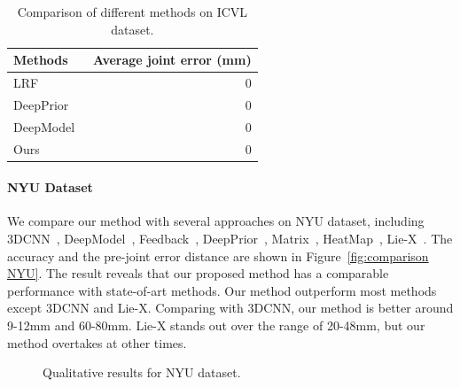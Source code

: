 \documentclass[journal,comsoc]{IEEEtran}
\let\MYoriglatexcaption\caption
\renewcommand{\caption}[2][\relax]{\MYoriglatexcaption[#2]{#2}}
\begin{document}
\begin{table}[htbp]
  \centering
  \caption{Comparison of different methods on ICVL dataset.}
    \begin{tabular}{|l|r|}\hline
    Methods & \multicolumn{1}{l}{Average joint error (mm)} \\\hline
    LRF~\cite{tang2014latent}   &  0\\
    DeepPrior~\cite{oberweger2015hands} &  0\\
    DeepModel~\cite{zhou2016model} &  0\\
    Ours  &  0\\
    \hline
    \end{tabular}%
  \label{tab:mean error ICVL}%
\end{table}%
\paragraph{NYU Dataset}\label{sec:nyu dataset}
We compare our method with several approaches on NYU dataset, including 3DCNN~\cite{ge2017_3D}, DeepModel~\cite{zhou2016model}, 
Feedback~\cite{oberweger2015training}, DeepPrior~\cite{oberweger2015hands}, Matrix~\cite{sinha2016deephand}, HeatMap~\cite{tompson2014real}, 
Lie-X~\cite{xu2017lie}. The accuracy and the pre-joint error distance are shown in Figure~\ref{fig:comparison NYU}. The result reveals 
that our proposed method has a comparable performance with state-of-art methods. Our method outperform most methods except 3DCNN and Lie-X. 
Comparing with 3DCNN, our method is better around 9-12mm and 60-80mm. Lie-X stands out over the range of 20-48mm, but our method overtakes 
at other times. 


\begin{figure}[t]\footnotesize
\centering
    \caption{Qualitative results for NYU dataset.}
    \label{fig:Qualitative result NYU}
\end{figure}
\end{document}
